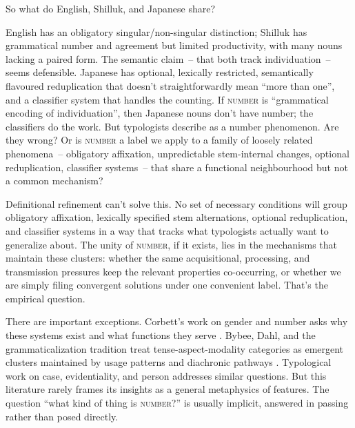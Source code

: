 So what do English, Shilluk, and Japanese share?

English has an obligatory singular/non-singular distinction; Shilluk has grammatical number and agreement but limited productivity, with many nouns lacking a paired form. The semantic claim~-- that both track individuation~-- seems defensible. Japanese has optional, lexically restricted, semantically flavoured reduplication that doesn't straightforwardly mean \enquote{more than one}, and a classifier system that handles the counting. If \textsc{number} is \enquote{grammatical encoding of individuation}, then Japanese nouns don't have number; the classifiers do the work. But typologists describe  as a number phenomenon. Are they wrong? Or is \textsc{number} a label we apply to a family of loosely related phenomena~-- obligatory affixation, unpredictable stem-internal changes, optional reduplication, classifier systems~-- that share a functional neighbourhood but not a common mechanism?

Definitional refinement can't solve this. No set of necessary conditions will group obligatory affixation, lexically specified stem alternations, optional reduplication, and classifier systems in a way that tracks what typologists actually want to generalize about. The unity of \textsc{number}, if it exists, lies in the mechanisms that maintain these clusters: whether the same acquisitional, processing, and transmission pressures keep the relevant properties co-occurring, or whether we are simply filing convergent solutions under one convenient label. That's the empirical question.

There are important exceptions. Corbett's work on gender and number asks why these systems exist and what functions they serve \citep{corbett1991,corbett2000}. Bybee, Dahl, and the grammaticalization tradition treat tense-aspect-modality categories as emergent clusters maintained by usage patterns and diachronic pathways \citep{bybee1994,dahl1985}. Typological work on case, evidentiality, and person addresses similar questions. But this literature rarely frames its insights as a general metaphysics of features. The question \enquote{what kind of thing is \textsc{number}?} is usually implicit, answered in passing rather than posed directly.


